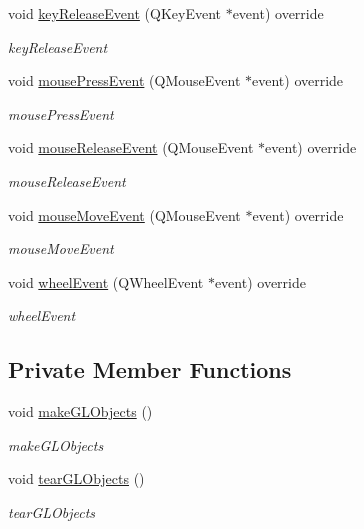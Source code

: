 \begin{DoxyCompactItemize}
void \hyperlink{classGLArea_ab3087976a0dbc5257aecf5e89d492eab}{key\+Release\+Event} (Q\+Key\+Event $\ast$event) override
\begin{DoxyCompactList}\small\item\em key\+Release\+Event \end{DoxyCompactList}\item 
void \hyperlink{classGLArea_aed19de6baa33397b6d3403a168a306b5}{mouse\+Press\+Event} (Q\+Mouse\+Event $\ast$event) override
\begin{DoxyCompactList}\small\item\em mouse\+Press\+Event \end{DoxyCompactList}\item 
void \hyperlink{classGLArea_a858693d86fe1e40a8a333466b93e0cdd}{mouse\+Release\+Event} (Q\+Mouse\+Event $\ast$event) override
\begin{DoxyCompactList}\small\item\em mouse\+Release\+Event \end{DoxyCompactList}\item 
void \hyperlink{classGLArea_a5222f8d2cee08e188c66fab93fcb5779}{mouse\+Move\+Event} (Q\+Mouse\+Event $\ast$event) override
\begin{DoxyCompactList}\small\item\em mouse\+Move\+Event \end{DoxyCompactList}\item 
void \hyperlink{classGLArea_a40884963629d3fb97a752875fd741e5e}{wheel\+Event} (Q\+Wheel\+Event $\ast$event) override
\begin{DoxyCompactList}\small\item\em wheel\+Event \end{DoxyCompactList}\end{DoxyCompactItemize}
\subsection*{Private Member Functions}
\begin{DoxyCompactItemize}
\item 
void \hyperlink{classGLArea_a6813d77eb9a8f03a1d61749f93d82120}{make\+G\+L\+Objects} ()
\begin{DoxyCompactList}\small\item\em make\+G\+L\+Objects \end{DoxyCompactList}\item 
void \hyperlink{classGLArea_a0492da4c02cd7265be107fe819da1196}{tear\+G\+L\+Objects} ()
\begin{DoxyCompactList}\small\item\em tear\+G\+L\+Objects \end{DoxyCompactList}\end{DoxyCompactItemize}
